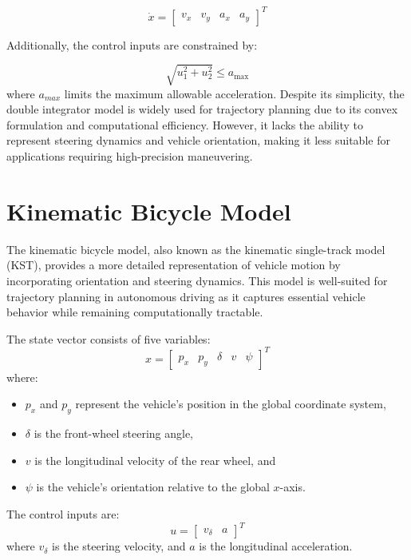 \begin{equation}
	\dot{x} = \begin{bmatrix}
		v_x &
		v_y &
		a_x &
		a_y
	\end{bmatrix}^T
\end{equation}

Additionally, the control inputs are constrained by:

\begin{equation}
	\sqrt{u_1^2 + u_2^2} \leq a_{\max}
\end{equation}
where $a_{max}$ limits the maximum allowable acceleration.
Despite its simplicity, the double integrator model is widely used for trajectory planning due to its convex formulation and computational
efficiency.
However, it lacks the ability to represent steering dynamics and vehicle orientation, making it less suitable for applications requiring
high-precision maneuvering.

\section{Kinematic Bicycle Model} \label{subsec:bicycle_model}

The kinematic bicycle model, also known as the kinematic single-track model (KST), provides a more detailed representation of vehicle motion by
incorporating orientation and steering dynamics.
This model is well-suited for trajectory planning in autonomous driving as it captures essential vehicle behavior while remaining computationally
tractable.

The state vector consists of five variables:
\begin{equation}
	x = \begin{bmatrix} p_x & p_y & \delta & v & \psi \end{bmatrix}^T
	\label{eq:states_kst}
\end{equation}
where:
\begin{itemize}
	\item $p_x$ and $p_y$ represent the vehicle's position in the global coordinate system,
	\item $\delta$ is the front-wheel steering angle,
	\item $v$ is the longitudinal velocity of the rear wheel, and
	\item $\psi$ is the vehicle's orientation relative to the global $x$-axis.
\end{itemize}

The control inputs are:
\begin{equation}
	u = \begin{bmatrix} v_{\delta} & a \end{bmatrix}^T
	\label{eq:controls_kst}
\end{equation}
where $v_{\delta}$ is the steering velocity, and $a$ is the longitudinal acceleration.

